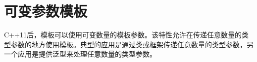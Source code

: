\chapter{可变参数模板}
C++11后，模板可以使用可变数量的模板参数。该特性允许在传递任意数量的类型参数的地方使用模板。典型的应用是通过类或框架传递任意数量的类型参数，另一个应用是提供泛型来处理任意数量的类型参数。




